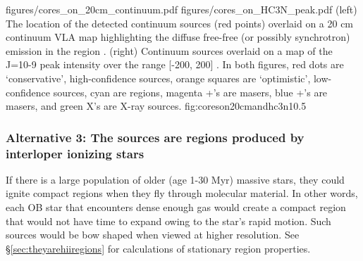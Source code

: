 \documentclass[twocolumn]{aastex61}
\begin{document}

%

\FigureTwo
{figures/cores_on_20cm_continuum.pdf}
{figures/cores_on_HC3N_peak.pdf}
{(left) The location of the detected continuum sources (red points) overlaid on a 20
cm continuum VLA map highlighting the diffuse free-free (or possibly
synchrotron) emission in the region \citep{Yusef-Zadeh2004a}.
(right) Continuum sources overlaid on a map
of the \cyanoacetylene J=10-9 peak intensity over the range [-200, 200] \kms.
  In both figures, red
dots are `conservative',
high-confidence sources, orange squares are `optimistic', low-confidence sources,
cyan are \hii regions, magenta +'s are \methanol masers, blue +'s are \water
masers, and green X's are X-ray sources.
}
{fig:coreson20cmandhc3n}{1}{0.5\textwidth}

\subsubsection{Alternative 3: The sources are \hii regions produced by
interloper ionizing stars}
\label{sec:alt2}
If there is a large population of older (age 1-30 Myr) massive stars, they
could ignite compact \hii regions when they fly through molecular material.  In
other words, each OB star that encounters dense enough gas would create a
compact \hii region that would not have time to expand owing to the star's rapid
motion.  Such sources would be bow shaped when viewed at higher resolution.
See \S \ref{sec:theyarehiiregions} for calculations of stationary \hii region
properties.
\end{document}

